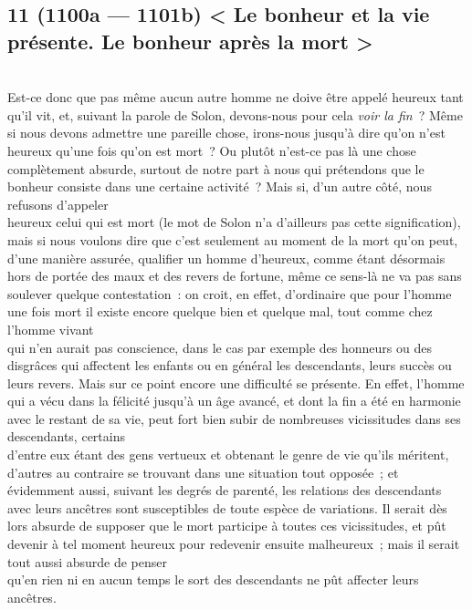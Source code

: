 \documentclass[french,twoside]{book} %
\begin{document}
\subsection[{11 (1100a — 1101b) < Le bonheur et la vie présente. Le bonheur après la mort >}]{11 (1100a — 1101b) < Le bonheur et la vie présente. Le bonheur après la mort >}
\noindent \\
Est-ce donc que pas même aucun autre homme ne doive être appelé heureux tant qu’il vit, et, suivant la parole de Solon, devons-nous pour cela {\itshape voir la fin} ? Même si nous devons admettre une pareille chose, irons-nous jusqu’à dire qu’on n’est heureux qu’une fois qu’on est mort ? Ou plutôt n’est-ce pas là une chose complètement absurde, surtout de notre part à nous qui prétendons que le bonheur consiste dans une certaine activité ? Mais si, d’un autre côté, nous refusons d’appeler \\
heureux celui qui est mort (le mot de Solon n’a d’ailleurs pas cette signification), mais si nous voulons dire que c’est seulement au moment de la mort qu’on peut, d’une manière assurée, qualifier un homme d’heureux, comme étant désormais hors de portée des maux et des revers de fortune, même ce sens-là ne va pas sans soulever quelque contestation : on croit, en effet, d’ordinaire que pour l’homme une fois mort il existe encore quelque bien et quelque mal, tout comme chez l’homme vivant \\
qui n’en aurait pas conscience, dans le cas par exemple des honneurs ou des disgrâces qui affectent les enfants ou en général les descendants, leurs succès ou leurs revers. Mais sur ce point encore une difficulté se présente. En effet, l’homme qui a vécu dans la félicité jusqu’à un âge avancé, et dont la fin a été en harmonie avec le restant de sa vie, peut fort bien subir de nombreuses vicissitudes dans ses descendants, certains \\
d’entre eux étant des gens vertueux et obtenant le genre de vie qu’ils méritent, d’autres au contraire se trouvant dans une situation tout opposée ; et évidemment aussi, suivant les degrés de parenté, les relations des descendants avec leurs ancêtres sont susceptibles de toute espèce de variations. Il serait dès lors absurde de supposer que le mort participe à toutes ces vicissitudes, et pût devenir à tel moment heureux pour redevenir ensuite malheureux ; mais il serait tout aussi absurde de penser \\
qu’en rien ni en aucun temps le sort des descendants ne pût affecter leurs ancêtres.\par
\end{document}

